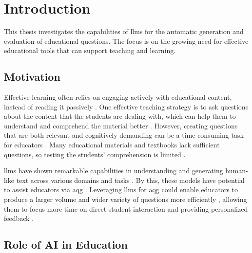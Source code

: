 \section{Introduction}

This thesis investigates the capabilities of \ac{llms} for the automatic generation and evaluation of educational questions. The focus is on the growing need for effective educational tools that can support teaching and learning.

\subsection{Motivation}

Effective learning often relies on engaging actively with educational content, instead of reading it passively \cite{steuer_i_2021}. One effective teaching strategy is to ask questions about the content that the students are dealing with, which can help them to understand and comprehend the material better \cite{steuer_i_2021}. However, creating questions that are both relevant and cognitively demanding can be a time-consuming task for educators \cite{steuer_i_2021,vu_chatgpt-based_2024}. Many educational materials and textbooks lack sufficient questions, so testing the students' comprehension is limited \cite{steuer_i_2021}.

\ac{llms} have shown remarkable capabilities in understanding and generating human-like text across various domains and tasks \cite{fan_bibliometric_2024,wang_history_2024}. By this, these models have potential to assist educators via \ac{aqg} \cite{vu_chatgpt-based_2024,ling_automatic_2024}. Leveraging \ac{llms} for \ac{aqg} could enable educators to produce a larger volume and wider variety of questions more efficiently \cite{scaria_how_2024,moore_automatic_2024,hang_mcqgen_2024}, allowing them to focus more time on direct student interaction \cite{doughty_comparative_2024,al_faraby_analysis_2024} and providing personalized feedback \cite{ling_automatic_2024}.

\subsection{Role of AI in Education}

